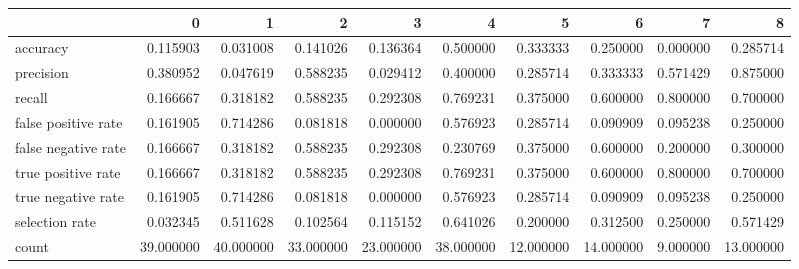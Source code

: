 \begin{tabular}{lrrrrrrrrr}
\toprule
{} &          0 &          1 &          2 &          3 &          4 &          5 &          6 &         7 &          8 \\
\midrule
accuracy            &   0.115903 &   0.031008 &   0.141026 &   0.136364 &   0.500000 &   0.333333 &   0.250000 &  0.000000 &   0.285714 \\
precision           &   0.380952 &   0.047619 &   0.588235 &   0.029412 &   0.400000 &   0.285714 &   0.333333 &  0.571429 &   0.875000 \\
recall              &   0.166667 &   0.318182 &   0.588235 &   0.292308 &   0.769231 &   0.375000 &   0.600000 &  0.800000 &   0.700000 \\
false positive rate &   0.161905 &   0.714286 &   0.081818 &   0.000000 &   0.576923 &   0.285714 &   0.090909 &  0.095238 &   0.250000 \\
false negative rate &   0.166667 &   0.318182 &   0.588235 &   0.292308 &   0.230769 &   0.375000 &   0.600000 &  0.200000 &   0.300000 \\
true positive rate  &   0.166667 &   0.318182 &   0.588235 &   0.292308 &   0.769231 &   0.375000 &   0.600000 &  0.800000 &   0.700000 \\
true negative rate  &   0.161905 &   0.714286 &   0.081818 &   0.000000 &   0.576923 &   0.285714 &   0.090909 &  0.095238 &   0.250000 \\
selection rate      &   0.032345 &   0.511628 &   0.102564 &   0.115152 &   0.641026 &   0.200000 &   0.312500 &  0.250000 &   0.571429 \\
count               &  39.000000 &  40.000000 &  33.000000 &  23.000000 &  38.000000 &  12.000000 &  14.000000 &  9.000000 &  13.000000 \\
\bottomrule
\end{tabular}
